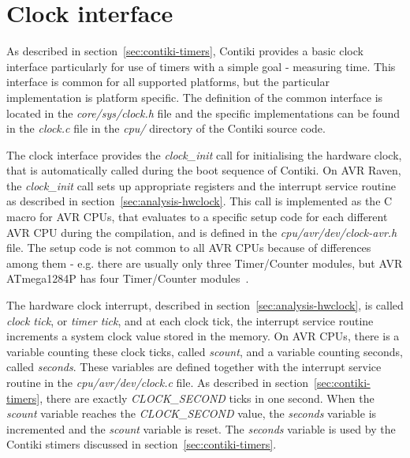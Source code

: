 
\section{Clock interface}
As described in section~\ref{sec:contiki-timers},
Contiki provides a basic clock interface particularly for use of timers
with a simple goal - measuring time.
This interface is common for all supported platforms,
but the particular implementation is platform specific.
The definition of the common interface is located in the {\it{core/sys/clock.h}} file
and the specific implementations can be found in the {\it{clock.c}} file
in the {\it{cpu/}} directory of the Contiki source code.

The clock interface provides the {\it{clock\_init}} call for initialising the hardware clock,
that is automatically called during the boot sequence of Contiki.
On AVR Raven, the {\it{clock\_init}} call sets up
appropriate registers and the interrupt service routine as described in section~\ref{sec:analysis-hwclock}.
This call is implemented as the C macro for AVR CPUs, that evaluates to a specific setup code for each
different AVR CPU during the compilation, and is defined in the {\it{cpu/avr/dev/clock-avr.h}} file.
The setup code is not common to all AVR CPUs because of differences among them - e.g. there are usually
only three Timer/Counter modules, but AVR ATmega1284P has four Timer/Counter modules~\cite{avr-datasheet}.

The hardware clock interrupt, described in section~\ref{sec:analysis-hwclock},
is called {\it{clock tick}}, or {\it{timer tick}}, and at each clock tick, the interrupt service routine increments
a system clock value stored in the memory.
On AVR CPUs, there is a variable counting these clock ticks, called {\it{scount}},
and a variable counting seconds, called {\it{seconds}}.
These variables are defined together with the interrupt service routine in the {\it{cpu/avr/dev/clock.c}} file.
As described in section~\ref{sec:contiki-timers}, there are exactly {\it{CLOCK\_SECOND}} ticks in one second.
When the {\it{scount}} variable reaches the {\it{CLOCK\_SECOND}} value,
the {\it{seconds}} variable is incremented and the {\it{scount}} variable is reset.
The {\it{seconds}} variable is used by the Contiki stimers discussed in section~\ref{sec:contiki-timers}.

